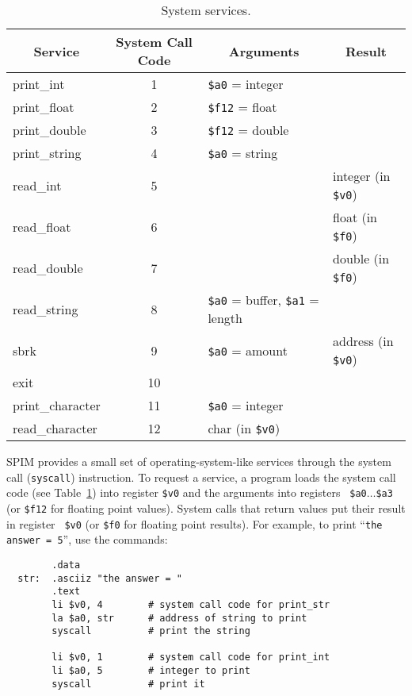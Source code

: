 \documentclass[11pt]{article}
\begin{document}
\begin{table}
  \small
  \begin{center}
  \begin{tabular}{|l|c|l|l|}
    \hline
     \multicolumn{1}{|c|}{\bf Service} &
	{\bf System Call Code} &
	\multicolumn{1}{|c|}{\bf Arguments} &
	\multicolumn{1}{|c|}{\bf Result} \\
     \hline
     \hline
      print\_int & 1 & {\tt \$a0} = integer & \\
      print\_float & 2 & {\tt \$f12} = float & \\
      print\_double & 3 & {\tt \$f12} = double & \\
      print\_string & 4 & {\tt \$a0} = string & \\
      read\_int & 5 & & integer (in {\tt \$v0}) \\
      read\_float & 6 & & float (in {\tt \$f0}) \\
      read\_double & 7 & & double (in {\tt \$f0}) \\
      read\_string & 8 & {\tt \$a0} = buffer, {\tt \$a1} = length & \\
      sbrk & 9 & {\tt \$a0} = amount & address (in {\tt \$v0}) \\
      exit & 10 & & \\
      print\_character & 11 & {\tt \$a0} = integer & \\
      read\_character & 12 & char (in {\tt \$v0}) \\
     \hline
  \end{tabular}
  \end{center}
  \caption{System services.}
  \label{tab:syscall}
\end{table}
SPIM provides a small set of operating-system-like services through
the system call ({\tt syscall}) instruction.  To request a service, a
program loads the system call code (see Table~\ref{tab:syscall}) into
register {\tt \$v0} and the arguments into registers {\tt
\$a0}$\ldots${\tt \$a3} (or {\tt \$f12} for floating point values).
System calls that return values put their result in register {\tt
\$v0} (or {\tt \$f0} for floating point results).  For example, to
print ``{\tt the answer = 5}'', use the commands:
\begin{verbatim}
        .data
  str:  .asciiz "the answer = "
        .text
        li $v0, 4        # system call code for print_str
        la $a0, str      # address of string to print
        syscall          # print the string

        li $v0, 1        # system call code for print_int
        li $a0, 5        # integer to print
        syscall          # print it
\end{verbatim}
\end{document}
